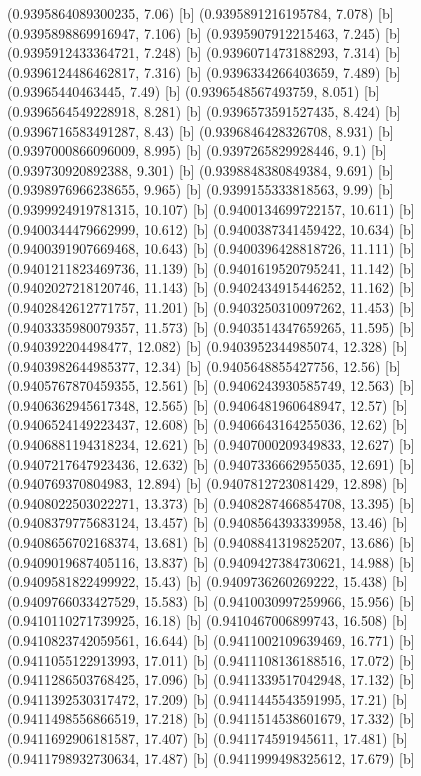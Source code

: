 {{{(0.9395864089300235, 7.06) [b] 
(0.9395891216195784, 7.078) [b] 
(0.9395898869916947, 7.106) [b] 
(0.9395907912215463, 7.245) [b] 
(0.9395912433364721, 7.248) [b] 
(0.9396071473188293, 7.314) [b] 
(0.9396124486462817, 7.316) [b] 
(0.9396334266403659, 7.489) [b] 
(0.93965440463445, 7.49) [b] 
(0.9396548567493759, 8.051) [b] 
(0.9396564549228918, 8.281) [b] 
(0.9396573591527435, 8.424) [b] 
(0.9396716583491287, 8.43) [b] 
(0.9396846428326708, 8.931) [b] 
(0.9397000866096009, 8.995) [b] 
(0.9397265829928446, 9.1) [b] 
(0.939730920892388, 9.301) [b] 
(0.9398848380849384, 9.691) [b] 
(0.9398976966238655, 9.965) [b] 
(0.9399155333818563, 9.99) [b] 
(0.9399924919781315, 10.107) [b] 
(0.9400134699722157, 10.611) [b] 
(0.9400344479662999, 10.612) [b] 
(0.9400387341459422, 10.634) [b] 
(0.9400391907669468, 10.643) [b] 
(0.9400396428818726, 11.111) [b] 
(0.9401211823469736, 11.139) [b] 
(0.9401619520795241, 11.142) [b] 
(0.9402027218120746, 11.143) [b] 
(0.9402434915446252, 11.162) [b] 
(0.9402842612771757, 11.201) [b] 
(0.9403250310097262, 11.453) [b] 
(0.9403335980079357, 11.573) [b] 
(0.9403514347659265, 11.595) [b] 
(0.940392204498477, 12.082) [b] 
(0.9403952344985074, 12.328) [b] 
(0.9403982644985377, 12.34) [b] 
(0.9405648855427756, 12.56) [b] 
(0.9405767870459355, 12.561) [b] 
(0.9406243930585749, 12.563) [b] 
(0.9406362945617348, 12.565) [b] 
(0.9406481960648947, 12.57) [b] 
(0.9406524149223437, 12.608) [b] 
(0.9406643164255036, 12.62) [b] 
(0.9406881194318234, 12.621) [b] 
(0.9407000209349833, 12.627) [b] 
(0.9407217647923436, 12.632) [b] 
(0.9407336662955035, 12.691) [b] 
(0.940769370804983, 12.894) [b] 
(0.9407812723081429, 12.898) [b] 
(0.9408022503022271, 13.373) [b] 
(0.9408287466854708, 13.395) [b] 
(0.9408379775683124, 13.457) [b] 
(0.9408564393339958, 13.46) [b] 
(0.9408656702168374, 13.681) [b] 
(0.9408841319825207, 13.686) [b] 
(0.9409019687405116, 13.837) [b] 
(0.9409427384730621, 14.988) [b] 
(0.9409581822499922, 15.43) [b] 
(0.9409736260269222, 15.438) [b] 
(0.9409766033427529, 15.583) [b] 
(0.9410030997259966, 15.956) [b] 
(0.9410110271739925, 16.18) [b] 
(0.9410467006899743, 16.508) [b] 
(0.9410823742059561, 16.644) [b] 
(0.9411002109639469, 16.771) [b] 
(0.9411055122913993, 17.011) [b] 
(0.9411108136188516, 17.072) [b] 
(0.9411286503768425, 17.096) [b] 
(0.9411339517042948, 17.132) [b] 
(0.9411392530317472, 17.209) [b] 
(0.9411445543591995, 17.21) [b] 
(0.9411498556866519, 17.218) [b] 
(0.9411514538601679, 17.332) [b] 
(0.9411692906181587, 17.407) [b] 
(0.941174591945611, 17.481) [b] 
(0.9411798932730634, 17.487) [b] 
(0.9411999498325612, 17.679) [b] 
}}}
